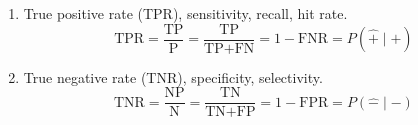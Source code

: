 \begin{enumerate}[noitemsep]
\item True positive rate (TPR), \ie sensitivity, recall, hit rate.
\begin{equation} \label{eq:TPR}
\text{TPR} = \frac{\text{TP}}{\text{P}} = \frac{\text{TP}}{\text{TP}+\text{FN}} = 1 - \text{FNR} = P\left(\hat{+} \mid + \right)
\end{equation}

\item True negative rate (TNR), \ie specificity, selectivity.
\begin{equation} \label{eq:TNR}
\text{TNR} = \frac{\text{NP}}{\text{N}} = \frac{\text{TN}}{\text{TN}+\text{FP}} = 1 - \text{FPR} = P\left(\hat{-} \mid - \right)
\end{equation}
\end{enumerate}


